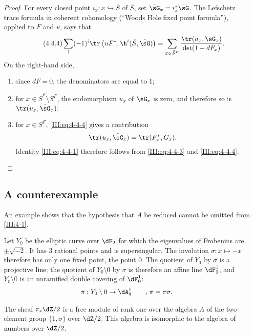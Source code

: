 \documentclass[oneside]{book}
\begin{document}
\begin{proof}
For every closed point $i_x:x\hookrightarrow \bar S$ of $\bar S$, set
$\bar\sG_x = i_x^*\bar\sG$. The Lefschetz trace formula in coherent
cohomology (``Woods Hole fixed point formula''), applied to $F$ and $u$, says
that
\begin{equation*}\tag{4.4.4}\label{III:eq:4-4-4}
  \sum_i (-1)^i \tr\left(uF^*, \h^i(\bar S,\bar\sG)\right) = \sum_{x\in \bar S^F} \frac{\tr(u_x,\sG_x)}{\det(1-d F_x)} \text{.}
\end{equation*}
On the right-hand side,
\begin{enumerate}[\indent a)]
  \item since $d F=0$, the denominators are equal to 1;
  \item for $x\in \bar S^F\setminus S^F$, the endomorphism $u_x$ of
    $\bar\sG_x$ is zero, and therefore so is $\tr(u_x,\bar\sG_x)$;
  \item for $x\in S^F$, \eqref{III:eq:4-4-4} gives a contribution
    \[
      \tr(u_x,\bar\sG_x) = \tr(F_x^*,G_x) \text{.}
    \]
    Identity \eqref{III:eq:4-4-1} therefore follows from
    \eqref{III:eq:4-4-3} and \eqref{III:eq:4-4-4}.
\end{enumerate}
\end{proof}






\subsection{A counterexample}\label{III:4-5}

An example shows that the hypothesis that $A$ be reduced cannot be omitted
from \ref{III:4-1}.

Let $Y_0$ be the elliptic curve over $\dF_2$ for which the eigenvalues of
Frobenius are $\pm \sqrt{-2}$. It has $3$ rational points and is
supersingular. The involution $\sigma:x\mapsto -x$ therefore has only one
fixed point, the point $0$. The quotient of $Y_0$ by $\sigma$ is a projective
line; the quotient of $Y_0\setminus 0$ by $\sigma$ is therefore an affine
line $\dF_0^1$, and $Y_0\setminus 0$ is an unramified double covering of
$\dF_0^1$:
\[
  \pi:Y_0\setminus 0 \to \dA_0^1 \qquad \text{, $\pi=\pi\sigma$.}
\]

The sheaf $\pi_*\dZ/2$ is a free module of rank one over the algebra $A$ of
the two-element group $\{1,\sigma\}$ over $\dZ/2$. This algebra is isomorphic
to the algebra of numbers over $\dZ/2$.
\end{document}
